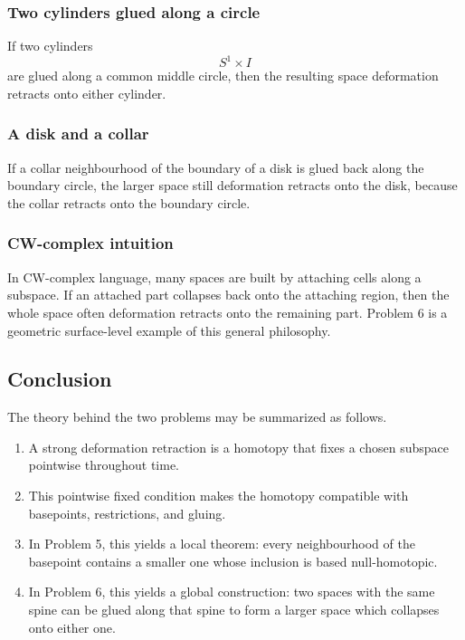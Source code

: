 \documentclass[12pt,a4paper]{article}
\theoremstyle{notespace}
\begin{document}
\subsubsection{Two cylinders glued along a circle}

If two cylinders
\[
S^1\times I
\]
are glued along a common middle circle, then the resulting space deformation retracts onto either cylinder.

\subsubsection{A disk and a collar}

If a collar neighbourhood of the boundary of a disk is glued back along the boundary circle, the larger space still deformation retracts onto the disk, because the collar retracts onto the boundary circle.

\subsubsection{CW-complex intuition}

In CW-complex language, many spaces are built by attaching cells along a subspace. If an attached part collapses back onto the attaching region, then the whole space often deformation retracts onto the remaining part. Problem 6 is a geometric surface-level example of this general philosophy.

\subsection{Conclusion}

The theory behind the two problems may be summarized as follows.

\begin{enumerate}
	\item A strong deformation retraction is a homotopy that fixes a chosen subspace pointwise throughout time.
	\item This pointwise fixed condition makes the homotopy compatible with basepoints, restrictions, and gluing.
	\item In Problem 5, this yields a local theorem: every neighbourhood of the basepoint contains a smaller one whose inclusion is based null-homotopic.
	\item In Problem 6, this yields a global construction: two spaces with the same spine can be glued along that spine to form a larger space which collapses onto either one.
\end{enumerate}
\end{document}
